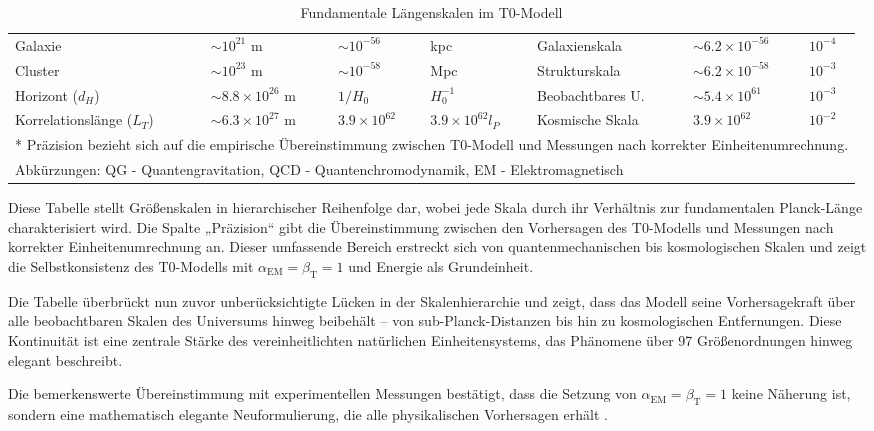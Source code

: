 \documentclass[12pt,a4paper]{article}
\newcommand{\alphaEM}{\alpha_{\text{EM}}}
\newcommand{\betaT}{\beta_{\text{T}}}
\begin{document}
\begin{table}[ht]
\begin{adjustbox}{scale=0.7}
\begin{tabular}{lllllll}
			Galaxie & $\sim 10^{21}$ m & $\sim 10^{-56}$ & kpc & Galaxienskala & $\sim 6.2 \times 10^{-56}$ & $10^{-4}$ \\
			Cluster & $\sim 10^{23}$ m & $\sim 10^{-58}$ & Mpc & Strukturskala & $\sim 6.2 \times 10^{-58}$ & $10^{-3}$ \\
			Horizont ($d_H$) & $\sim 8.8 \times 10^{26}$ m & $1/H_0$ & $H_0^{-1}$ & Beobachtbares U. & $\sim 5.4 \times 10^{61}$ & $10^{-3}$ \\
			Korrelationslänge ($L_T$) & $\sim 6.3 \times 10^{27}$ m & $3.9 \times 10^{62}$ & $3.9 \times 10^{62} l_P$ & Kosmische Skala & $3.9 \times 10^{62}$ & $10^{-2}$ \\
			\hline
			\multicolumn{7}{l}{* Präzision bezieht sich auf die empirische Übereinstimmung zwischen T0-Modell und Messungen nach korrekter Einheitenumrechnung.} \\
			\multicolumn{7}{l}{Abkürzungen: QG - Quantengravitation, QCD - Quantenchromodynamik, EM - Elektromagnetisch} \\
			\hline
		\end{tabular}
	\end{adjustbox}
	\caption{Fundamentale Längenskalen im T0-Modell}
	\label{tab:length_scales}
\end{table}

Diese Tabelle stellt Größenskalen in hierarchischer Reihenfolge dar, wobei jede Skala durch ihr Verhältnis zur fundamentalen Planck-Länge charakterisiert wird. Die Spalte „Präzision“ gibt die Übereinstimmung zwischen den Vorhersagen des T0-Modells und Messungen nach korrekter Einheitenumrechnung an. Dieser umfassende Bereich erstreckt sich von quantenmechanischen bis kosmologischen Skalen und zeigt die Selbstkonsistenz des T0-Modells mit $\alphaEM = \betaT = 1$ und Energie als Grundeinheit.

Die Tabelle überbrückt nun zuvor unberücksichtigte Lücken in der Skalenhierarchie und zeigt, dass das Modell seine Vorhersagekraft über alle beobachtbaren Skalen des Universums hinweg beibehält – von sub-Planck-Distanzen bis hin zu kosmologischen Entfernungen. Diese Kontinuität ist eine zentrale Stärke des vereinheitlichten natürlichen Einheitensystems, das Phänomene über 97 Größenordnungen hinweg elegant beschreibt.

Die bemerkenswerte Übereinstimmung mit experimentellen Messungen bestätigt, dass die Setzung von $\alphaEM = \betaT = 1$ keine Näherung ist, sondern eine mathematisch elegante Neuformulierung, die alle physikalischen Vorhersagen erhält \cite{pascher_emergente_2025, pascher_alphabeta_2025}.
\end{document}
